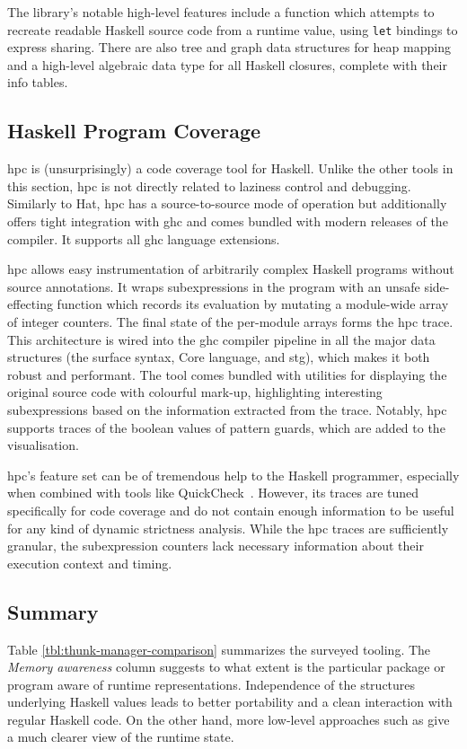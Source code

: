\documentclass[thesis=B,english]{FITthesis}[2019/12/23]
\newcommand{\hsCode}[1]{\texttt{#1}}
\begin{document}
The library's notable high-level features include a function which attempts to
recreate readable Haskell source code from a runtime value, using \hsCode{let}
bindings to express sharing. There are also tree and graph data structures for
heap mapping and a high-level algebraic data type for all Haskell closures,
complete with their info tables.


\subsection*{Haskell Program Coverage} \label{sec:hpc}
\acrlong{hpc}\cite{hpc-paper} is (unsurprisingly) a code coverage tool for
Haskell. Unlike the other tools in this section, \acrshort{hpc} is not directly
related to laziness control and debugging. Similarly to Hat, \acrshort{hpc} has
a source-to-source mode of operation but additionally offers tight integration
with \acrshort{ghc} and comes bundled with modern releases of the compiler. It
supports all \acrshort{ghc} language extensions.

\acrshort{hpc} allows easy instrumentation of arbitrarily complex Haskell
programs without source annotations. It wraps subexpressions in the program
with an unsafe side-effecting function which records its evaluation by mutating
a module-wide array of integer counters. The final state of the per-module
arrays forms the \acrshort{hpc} trace. This architecture is wired into the
\acrshort{ghc} compiler pipeline in all the major data structures (the surface
syntax, Core language, and \acrshort{stg}), which makes it both robust and
per\-for\-mant. The tool comes bundled with utilities for displaying the
original source code with colourful mark-up, highlighting interesting
subexpressions based on the information extracted from the trace. Notably,
\acrshort{hpc} supports traces of the boolean values of pattern guards, which
are added to the visualisation.

\acrshort{hpc}'s feature set can be of tremendous help to the Haskell
programmer, especially when combined with tools like
QuickCheck~\cite{quickcheck-paper}. However, its traces are tuned specifically
for code coverage and do not contain enough information to be useful for any
kind of dynamic strictness analysis. While the \acrshort{hpc} traces are
sufficiently granular, the subexpression counters lack necessary information
about their execution context and timing.


\subsection*{Summary} \label{sec:summary}
Table \ref{tbl:thunk-manager-comparison} summarizes the surveyed tooling. The
\textit{Memory awareness} column suggests to what extent is the particular
package or program aware of runtime representations. Independence of the
structures underlying Haskell values leads to better portability and a clean
interaction with regular Haskell code. On the other hand, more low-level
approaches such as  give a much clearer view of the
runtime state.
\end{document}
